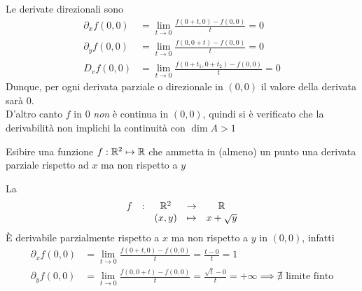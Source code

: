 \begin{exercise}
	\begin{solution}
		Le derivate direzionali sono
		\begin{align*}
			\partial_x f(0,0) &= \lim\limits_{t \to 0} \frac{f(0+t,0)-f(0,0)}{t} = 0\\
			\partial_y f(0,0) &= \lim\limits_{t \to 0} \frac{f(0,0+t)-f(0,0)}{t} = 0\\
			D_v f(0,0) &= \lim\limits_{t \to 0} \frac{f(0+t_1,0+t_2)-f(0,0)}{t} = 0
		\end{align*}
		Dunque, per ogni derivata parziale o direzionale in $(0,0)$ il valore della derivata sarà $0$.\\
		D'altro canto $f$ in $0$ \textit{non} è continua in $(0,0)$, quindi si è verificato che la derivabilità non implichi la continuità con $\dim A > 1$
	\end{solution}
\end{exercise}
\begin{exercise}
	Esibire una funzione $f: \mathbb{R}^2 \mapsto \mathbb{R}$ che ammetta in (almeno) un punto una derivata parziale rispetto ad $x$ ma non rispetto a $y$
	\begin{solution}
		La
		\[\begin{array}{ccccc} {f} & : & {\mathbb{R}^2} & \to & {\mathbb{R}} \\ & & {(x,y)} & \mapsto & {x+\sqrt{y}} \\ \end{array}\]
		È derivabile parzialmente rispetto a $x$ ma non rispetto a $y$ in $(0,0)$, infatti
		\begin{align*}
			\partial_x f(0,0) &= \lim\limits_{t \to 0} \frac{f(0+t,0)-f(0,0)}{t} = \frac{t-0}{t} = 1\\
			\partial_y f(0,0) &= \lim\limits_{t \to 0} \frac{f(0,0+t)-f(0,0)}{t} = \frac{\sqrt{t}-0}{t} = +\infty \implies \nexists \text{ limite finto}
		\end{align*}
	\end{solution}
\end{exercise}

\newpage
